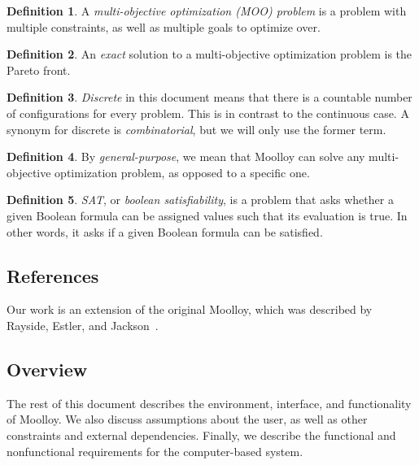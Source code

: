 \documentclass[11pt]{article}
\theoremstyle{definition}
\newtheorem{mydef}{Definition}
\begin{document}
\begin{mydef}
A \textit{multi-objective optimization (MOO) problem} is a problem with
multiple constraints, as well as multiple goals to optimize over.
\end{mydef}

\begin{mydef}
An \textit{exact} solution to a multi-objective optimization problem is
the Pareto front.
\end{mydef}

\begin{mydef}
\textit{Discrete} in this document means that there is a countable
number of configurations for every problem. This is in contrast to the
continuous case. A synonym for discrete is \textit{combinatorial}, but
we will only use the former term.  \end{mydef}

\begin{mydef}
By \textit{general-purpose}, we mean that Moolloy can solve any
multi-objective optimization problem, as opposed to a specific one.
\end{mydef}

\begin{mydef}
\textit{SAT}, or \textit{boolean satisfiability}, is a problem that
asks whether a given Boolean formula can be assigned values such that
its evaluation is true. In other words, it asks if a given Boolean
formula can be satisfied.
\end{mydef}

\subsection{References}\label{sec:ref}

Our work is an extension of the original Moolloy, which was described
by Rayside, Estler, and Jackson~\cite{ref:Rayside09}.

\subsection{Overview}\label{sec:overview}

The rest of this document describes the environment, interface, and
functionality of Moolloy. We also discuss assumptions about the user,
as well as other constraints and external dependencies. Finally, we
describe the functional and nonfunctional requirements for the
computer-based system.
\end{document}
